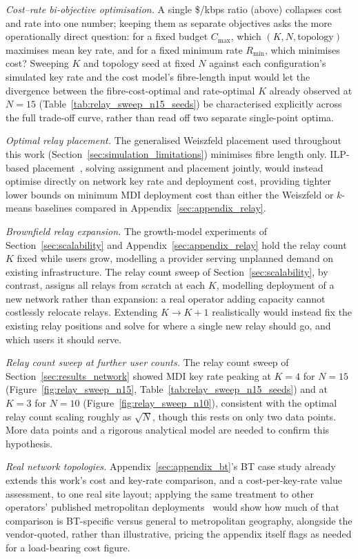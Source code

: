 \documentclass[12pt]{article}
\begin{document}
\textit{Cost--rate bi-objective optimisation.} A single \$/kbps ratio (above) collapses cost and rate into one number; keeping them as separate objectives asks the more operationally direct question: for a fixed budget $C_\text{max}$, which $(K,N,\text{topology})$ maximises mean key rate, and for a fixed minimum rate $R_\text{min}$, which minimises cost? Sweeping $K$ and topology seed at fixed $N$ against each configuration's simulated key rate and the cost model's fibre-length input would let the divergence between the fibre-cost-optimal and rate-optimal $K$ already observed at $N=15$ (Table~\ref{tab:relay_sweep_n15_seeds}) be characterised explicitly across the full trade-off curve, rather than read off two separate single-point optima.

\textit{Optimal relay placement.} The generalised Weiszfeld placement used throughout this work (Section~\ref{sec:simulation_limitations}) minimises fibre length only. ILP-based placement~\cite{DBLP:conf/ondm/KaraviasHBLP25}, solving assignment and placement jointly, would instead optimise directly on network key rate and deployment cost, providing tighter lower bounds on minimum MDI deployment cost than either the Weiszfeld or $k$-means baselines compared in Appendix~\ref{sec:appendix_relay}.

\textit{Brownfield relay expansion.} The growth-model experiments of Section~\ref{sec:scalability} and Appendix~\ref{sec:appendix_relay} hold the relay count $K$ fixed while users grow, modelling a provider serving unplanned demand on existing infrastructure. The relay count sweep of Section~\ref{sec:scalability}, by contrast, assigns all relays from scratch at each $K$, modelling deployment of a new network rather than expansion: a real operator adding capacity cannot costlessly relocate relays. Extending $K \to K+1$ realistically would instead fix the existing relay positions and solve for where a single new relay should go, and which users it should serve.

\textit{Relay count sweep at further user counts.} The relay count sweep of Section~\ref{sec:results_network} showed MDI key rate peaking at $K=4$ for $N=15$ (Figure~\ref{fig:relay_sweep_n15}, Table~\ref{tab:relay_sweep_n15_seeds}) and at $K=3$ for $N=10$ (Figure~\ref{fig:relay_sweep_n10}), consistent with the optimal relay count scaling roughly as $\sqrt{N}$, though this rests on only two data points. More data points and a rigorous analytical model are needed to confirm this hypothesis.

\textit{Real network topologies.} Appendix~\ref{sec:appendix_bt}'s BT case study already extends this work's cost and key-rate comparison, and a cost-per-key-rate value assessment, to one real site layout; applying the same treatment to other operators' published metropolitan deployments~\cite{Dynes_2019, Berrevoets_2022, Tang_2016} would show how much of that comparison is BT-specific versus general to metropolitan geography, alongside the vendor-quoted, rather than illustrative, pricing the appendix itself flags as needed for a load-bearing cost figure.
\end{document}
